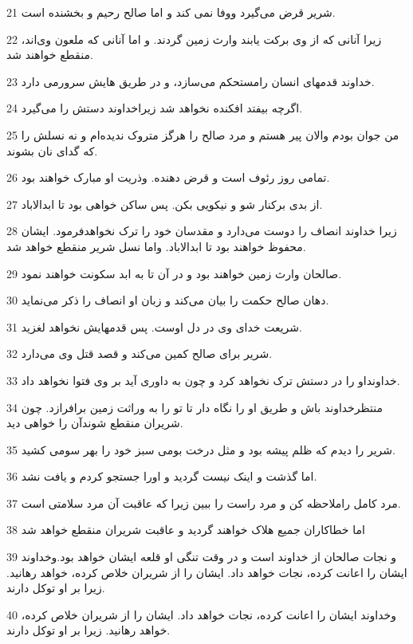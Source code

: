 \par 21 شریر قرض می‌گیرد ووفا نمی کند و اما صالح رحیم و بخشنده است.
\par 22 زیرا آنانی که از وی برکت یابند وارث زمین گردند. و اما آنانی که ملعون وی‌اند، منقطع خواهند شد.
\par 23 خداوند قدمهای انسان رامستحکم می‌سازد، و در طریق هایش سرورمی دارد.
\par 24 اگر‌چه بیفتد افکنده نخواهد شد زیراخداوند دستش را می‌گیرد.
\par 25 من جوان بودم والان پیر هستم و مرد صالح را هرگز متروک ندیده‌ام و نه نسلش را که گدای نان بشوند.
\par 26 تمامی روز رئوف است و قرض دهنده. وذریت او مبارک خواهند بود.
\par 27 از بدی برکنار شو و نیکویی بکن. پس ساکن خواهی بود تا ابدالاباد.
\par 28 زیرا خداوند انصاف را دوست می‌دارد و مقدسان خود را ترک نخواهدفرمود. ایشان محفوظ خواهند بود تا ابدالاباد. واما نسل شریر منقطع خواهد شد.
\par 29 صالحان وارث زمین خواهند بود و در آن تا به ابد سکونت خواهند نمود.
\par 30 دهان صالح حکمت را بیان می‌کند و زبان او انصاف را ذکر می‌نماید.
\par 31 شریعت خدای وی در دل اوست. پس قدمهایش نخواهد لغزید.
\par 32 شریر برای صالح کمین می‌کند و قصد قتل وی می‌دارد.
\par 33 خداونداو را در دستش ترک نخواهد کرد و چون به داوری آید بر وی فتوا نخواهد داد.
\par 34 منتظرخداوند باش و طریق او را نگاه دار تا تو را به وراثت زمین برافرازد. چون شریران منقطع شوندآن را خواهی دید. 
\par 35 شریر را دیدم که ظلم پیشه بود و مثل درخت بومی سبز خود را بهر سومی کشید.
\par 36 اما گذشت و اینک نیست گردید و اورا جستجو کردم و یافت نشد.
\par 37 مرد کامل راملاحظه کن و مرد راست را ببین زیرا که عاقبت آن مرد سلامتی است.
\par 38 اما خطاکاران جمیع هلاک خواهند گردید و عاقبت شریران منقطع خواهد شد
\par 39 و نجات صالحان از خداوند است و در وقت تنگی او قلعه ایشان خواهد بود.وخداوند ایشان را اعانت کرده، نجات خواهد داد. ایشان را از شریران خلاص کرده، خواهد رهانید. زیرا بر او توکل دارند.
\par 40 وخداوند ایشان را اعانت کرده، نجات خواهد داد. ایشان را از شریران خلاص کرده، خواهد رهانید. زیرا بر او توکل دارند.
 
